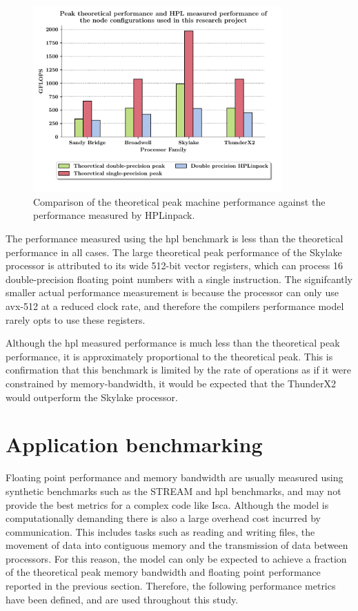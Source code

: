 \documentclass[a4paper,11pt]{report}
\begin{document}
\begin{figure}[htbp]
\begin{center}
\includegraphics[width=0.85\textwidth]{img/hpl.pdf}
\caption[High performance Linpack benchmark]{Comparison of the theoretical peak machine performance against the performance measured by HPLinpack. }
\label{fig:hpl}
\end{center}
\end{figure}
\par
The performance measured using the \gls{hpl} benchmark is less than the theoretical performance in all cases. The large theoretical peak performance of the Skylake processor is attributed to its wide 512-bit vector registers, which can process 16 double-precision floating point numbers with a single instruction. The signifcantly smaller actual performance measurement is because the processor can only use \gls{avx}-512 at a reduced clock rate, and therefore the compilers performance model rarely opts to use these registers. 
\par
Although the \gls{hpl} measured performance is much less than the theoretical peak performance, it is approximately proportional to the theoretical peak. This is confirmation that this benchmark is limited by the rate of operations as if it were constrained by memory-bandwidth, it would be expected that the ThunderX2 would outperform the Skylake processor.



\section{Application benchmarking}
\label{sec:app-benchmarking}
Floating point performance and memory bandwidth are usually measured using synthetic benchmarks such as the STREAM and \gls{hpl} benchmarks, and may not provide the best metrics for a complex code like Isca. Although the model is computationally demanding there is also a large overhead cost incurred by communication. This includes tasks such as reading and writing files, the movement of data into contiguous memory and the transmission of data between processors. For this reason, the model can only be expected to achieve a fraction of the theoretical peak memory bandwidth and floating point performance reported in the previous section. Therefore, the following performance metrics have been defined, and are used throughout this study.
\end{document}
